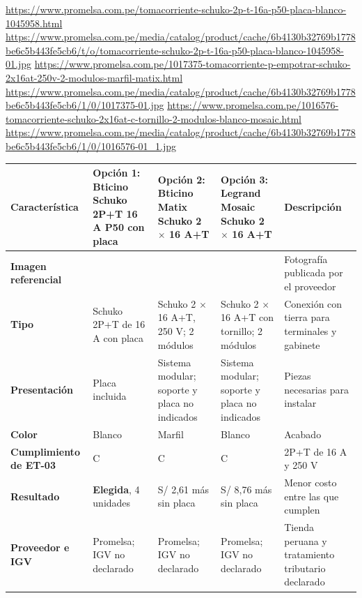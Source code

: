 \begin{landscape}
\urldef{\cotudr}\url{https://www.promelsa.com.pe/tomacorriente-schuko-2p-t-16a-p50-placa-blanco-1045958.html}
\urldef{\cotuds}\url{https://www.promelsa.com.pe/media/catalog/product/cache/6b4130b32769b1778be6c5b443fe5cb6/t/o/tomacorriente-schuko-2p-t-16a-p50-placa-blanco-1045958-01.jpg}
\urldef{\cotudt}\url{https://www.promelsa.com.pe/1017375-tomacorriente-p-empotrar-schuko-2x16at-250v-2-modulos-marfil-matix.html}
\urldef{\cotudu}\url{https://www.promelsa.com.pe/media/catalog/product/cache/6b4130b32769b1778be6c5b443fe5cb6/1/0/1017375-01.jpg}
\urldef{\cotudv}\url{https://www.promelsa.com.pe/1016576-tomacorriente-schuko-2x16at-c-tornillo-2-modulos-blanco-mosaic.html}
\urldef{\cotudw}\url{https://www.promelsa.com.pe/media/catalog/product/cache/6b4130b32769b1778be6c5b443fe5cb6/1/0/1016576-01_1.jpg}
\par\noindent\begin{minipage}{\linewidth}\formatofichas
{}\label{tab:cot-toma}
\begin{tabularx}{\linewidth}{@{}>{\raggedright\arraybackslash}p{3.0cm}YYY>{\raggedright\arraybackslash}p{4.4cm}@{}}
\toprule
\textbf{Característica} & \textbf{Opción 1: Bticino Schuko 2P+T 16 A P50 con placa} & \textbf{Opción 2: Bticino Matix Schuko 2 $\times$ 16 A+T} & \textbf{Opción 3: Legrand Mosaic Schuko 2 $\times$ 16 A+T} & \textbf{Descripción}\\\midrule
\textbf{Imagen referencial} &  &  &  & Fotografía publicada por el proveedor\\
\textbf{Tipo} & Schuko 2P+T de 16 A con placa & Schuko 2 $\times$ 16 A+T, 250 V; 2 módulos & Schuko 2 $\times$ 16 A+T con tornillo; 2 módulos & Conexión con tierra para terminales y gabinete\\
\textbf{Presentación} & Placa incluida & Sistema modular; soporte y placa no indicados & Sistema modular; soporte y placa no indicados & Piezas necesarias para instalar\\
\textbf{Color} & Blanco & Marfil & Blanco & Acabado\\
\textbf{Cumplimiento de ET-03} & C & C & C & 2P+T de 16 A y 250 V\\
\textbf{Resultado} & \textbf{Elegida}, 4 unidades & S/ 2,61 más sin placa & S/ 8,76 más sin placa & Menor costo entre las que cumplen\\
\textbf{Proveedor e IGV} & Promelsa; IGV no declarado & Promelsa; IGV no declarado & Promelsa; IGV no declarado & Tienda peruana y tratamiento tributario declarado\\

\end{tabularx}
\end{minipage}
\end{landscape}
